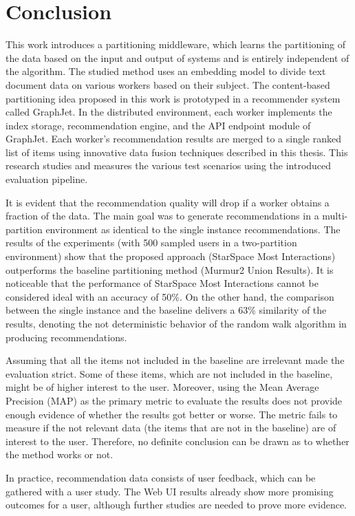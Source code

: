 \chapter{Conclusion}

This work introduces a partitioning middleware, which learns the partitioning of the data based on the input and output of systems and is entirely independent of the algorithm. The studied method uses an embedding model to divide text document data on various workers based on their subject. The content-based partitioning idea proposed in this work is prototyped in a recommender system called GraphJet. In the distributed environment, each worker implements the index storage, recommendation engine, and the API endpoint module of GraphJet. Each worker's recommendation results are merged to a single ranked list of items using innovative data fusion techniques described in this thesis. This research studies and measures the various test scenarios using the introduced evaluation pipeline.


It is evident that the recommendation quality will drop if a worker obtains a fraction of the data. The main goal was to generate recommendations in a multi-partition environment as identical to the single instance recommendations. The results of the experiments (with 500 sampled users in a two-partition environment) show that the proposed approach (StarSpace Most Interactions) outperforms the baseline partitioning method (Murmur2 Union Results). It is noticeable that the performance of StarSpace Most Interactions cannot be considered ideal with an accuracy of 50\%. On the other hand, the comparison between the single instance and the baseline delivers a 63\% similarity of the results, denoting the not deterministic behavior of the random walk algorithm in producing recommendations.


Assuming that all the items not included in the baseline are irrelevant made the evaluation strict. Some of these items, which are not included in the baseline, might be of higher interest to the user. Moreover, using the Mean Average Precision (MAP) as the primary metric to evaluate the results does not provide enough evidence of whether the results got better or worse. The metric fails to measure if the not relevant data (the items that are not in the baseline) are of interest to the user. Therefore, no definite conclusion can be drawn as to whether the method works or not. 


In practice, recommendation data consists of user feedback, which can be gathered with a user study. The Web UI results already show more promising outcomes for a user, although further studies are needed to prove more evidence. 


